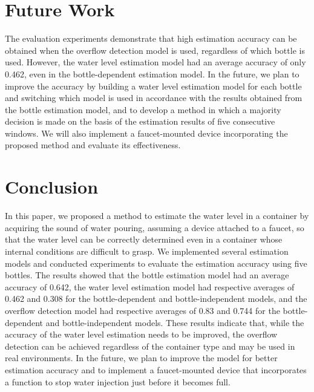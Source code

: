 \documentclass[sigconf]{acmart}
\begin{document}
\section{Future Work}
\label{sec:future_work}
The evaluation experiments demonstrate that high estimation accuracy can be obtained when the overflow detection model is used, regardless of which bottle is used. However, the water level estimation model had an average accuracy of only 0.462, even in the bottle-dependent estimation model. In the future, we plan to improve the accuracy by building a water level estimation model for each bottle and switching which model is used in accordance with the results obtained from the bottle estimation model, and to develop a method in which a majority decision is made on the basis of the estimation results of five consecutive windows. We will also implement a faucet-mounted device incorporating the proposed method and evaluate its effectiveness.



\section{Conclusion}
\label{sec:conclution}
In this paper, we proposed a method to estimate the water level in a container by acquiring the sound of water pouring, assuming a device attached to a faucet, so that the water level can be correctly determined even in a container whose internal conditions are difficult to grasp. We implemented several estimation models and conducted experiments to evaluate the estimation accuracy using five bottles. The results showed that the bottle estimation model had an average accuracy of 0.642, the water level estimation model had respective averages of 0.462 and 0.308 for the bottle-dependent and bottle-independent models, and the overflow detection model had respective averages of 0.83 and 0.744 for the bottle-dependent and bottle-independent models. These results indicate that, while the accuracy of the water level estimation needs to be improved, the overflow detection can be achieved regardless of the container type and may be used in real environments. In the future, we plan to improve the model for better estimation accuracy and to implement a faucet-mounted device that incorporates a function to stop water injection just before it becomes full.





\end{document}
